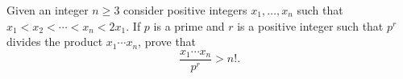 Given an integer $n\ge3$ consider positive integers $x_1,\ldots,x_n$ such that $x_1<x_2<\cdots<x_n<2x_1$. If $p$ is a prime and $r$ is a positive integer such that $p^r$ divides the product $x_1\cdots x_n$, prove that $$\frac{x_1\cdots x_n}{p^r}>n!.$$
